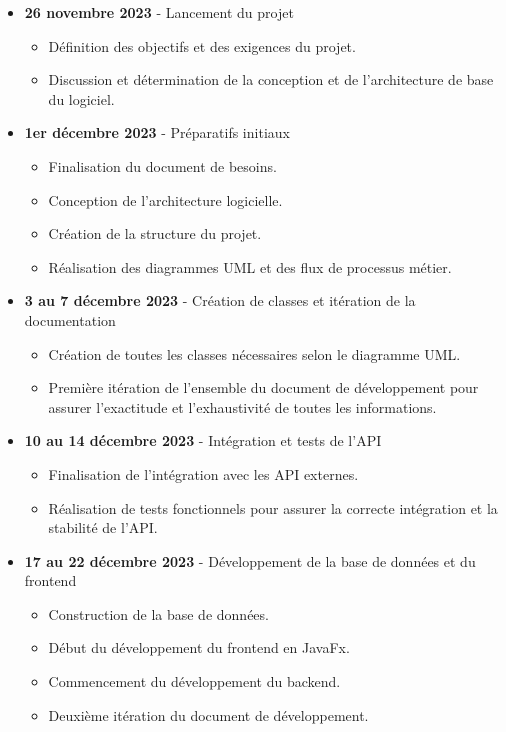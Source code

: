 \documentclass{article}
\begin{document}
\begin{itemize}
    \item \textbf{26 novembre 2023} - Lancement du projet
    \begin{itemize}
        \item Définition des objectifs et des exigences du projet.
        \item Discussion et détermination de la conception et de l'architecture de base du logiciel.
    \end{itemize}

    \item \textbf{1er décembre 2023} - Préparatifs initiaux
    \begin{itemize}
        \item Finalisation du document de besoins.
        \item Conception de l'architecture logicielle.
        \item Création de la structure du projet.
        \item Réalisation des diagrammes UML et des flux de processus métier.
    \end{itemize}

    \item \textbf{3 au 7 décembre 2023} - Création de classes et itération de la documentation
    \begin{itemize}
        \item Création de toutes les classes nécessaires selon le diagramme UML.
        \item Première itération de l'ensemble du document de développement pour assurer l'exactitude et l'exhaustivité de toutes les informations.
    \end{itemize}

    \item \textbf{10 au 14 décembre 2023} - Intégration et tests de l'API
    \begin{itemize}
        \item Finalisation de l'intégration avec les API externes.
        \item Réalisation de tests fonctionnels pour assurer la correcte intégration et la stabilité de l'API.
    \end{itemize}

    \item \textbf{17 au 22 décembre 2023} - Développement de la base de données et du frontend
    \begin{itemize}
        \item Construction de la base de données.
        \item Début du développement du frontend en JavaFx.
        \item Commencement du développement du backend.
        \item Deuxième itération du document de développement.
    \end{itemize}


\end{itemize}
\end{document}
